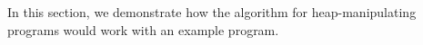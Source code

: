 
\label{ch:example}
%

In this section, we demonstrate how the \impact algorithm for heap-manipulating programs would work with an example program.